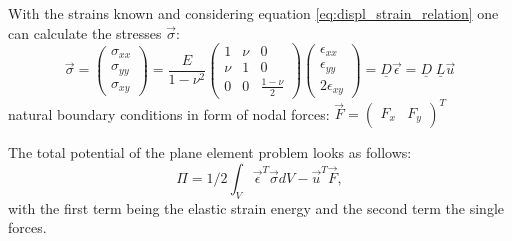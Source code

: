   With the strains known and considering equation \ref{eq:displ_strain_relation} one can calculate the stresses $\vec{\sigma}$:
  \begin{equation}\label{eq:sigma=D*eps}
  \vec{\sigma} = \begin{pmatrix}
  \sigma_{xx} \\
  \sigma_{yy} \\
  \sigma_{xy}
  \end{pmatrix} = \frac{E}{1-\nu^2} \begin{pmatrix}
  1 & \nu & 0 \\
  \nu & 1 & 0 \\
  0 & 0 & \frac{1-\nu}{2}
  \end{pmatrix} \begin{pmatrix}
  \epsilon_{xx} \\
  \epsilon_{yy} \\
  2\epsilon_{xy}
  \end{pmatrix} = \underline{D} \vec{\epsilon} = \underline{D}\; \underline{L} \vec{u}
  \end{equation}
  natural boundary conditions in form of nodal forces: $\vec{F} = \begin{pmatrix}
  F_x & F_y
  \end{pmatrix}^T$
  
  The total potential of the plane element problem looks as follows:
  \begin{equation}\label{eq:planeFunctional}
  \Pi = 1/2 \int_{V}\vec{\epsilon}^T\vec{\sigma}dV - \vec{u}^T \vec{F},
  \end{equation}
  with the first term being the elastic strain energy and the second term the single forces.
  
  
  
  
  
  
  
  
